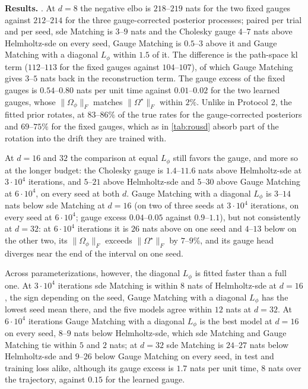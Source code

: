 \documentclass{article} %
\newcommand{\gauge}{\Omega}
\begin{document}
\textbf{Results.} . At $d = 8$ the negative \gls{elbo} is $218$--$219$ nats for the two fixed gauges against $212$--$214$ for the three gauge-corrected posterior processes; paired per trial and per seed, \gls{sde} Matching is $3$--$9$ nats and the Cholesky gauge $4$--$7$ nats above Helmholtz-\gls{sde} on every seed, Gauge Matching is $0.5$--$3$ above it and Gauge Matching with a diagonal $L_\phi$ within $1.5$ of it. The difference is the path-space \gls{kl} term ($112$--$113$ for the fixed gauges against $104$--$107$), of which Gauge Matching gives $3$--$5$ nats back in the reconstruction term. The gauge excess of the fixed gauges is $0.54$--$0.80$ nats per unit time against $0.01$--$0.02$ for the two learned gauges, whose $\|\gauge_\phi\|_F$ matches $\|\gauge^\star\|_F$ within $2\%$. Unlike in Protocol 2, the fitted prior rotates, at $83$--$86\%$ of the true rates for the gauge-corrected posteriors and $69$--$75\%$ for the fixed gauges, which as in \cref{tab:rousd} absorb part of the rotation into the drift they are trained with.

At $d = 16$ and $32$ the comparison at equal $L_\phi$ still favors the gauge, and more so at the longer budget: the Cholesky gauge is $1.4$--$11.6$ nats above Helmholtz-\gls{sde} at $3 \cdot 10^4$ iterations, and $5$--$21$ above Helmholtz-\gls{sde} and $5$--$30$ above Gauge Matching at $6 \cdot 10^4$, on every seed at both $d$. Gauge Matching with a diagonal $L_\phi$ is $3$--$14$ nats below \gls{sde} Matching at $d = 16$ (on two of three seeds at $3 \cdot 10^4$ iterations, on every seed at $6 \cdot 10^4$; gauge excess $0.04$--$0.05$ against $0.9$--$1.1$), but not consistently at $d = 32$: at $6 \cdot 10^4$ iterations it is $26$ nats above on one seed and $4$--$13$ below on the other two, its $\|\gauge_\phi\|_F$ exceeds $\|\gauge^\star\|_F$ by $7$--$9\%$, and its gauge head diverges near the end of the interval on one seed.

Across parameterizations, however, the diagonal $L_\phi$ is fitted faster than a full one. At $3 \cdot 10^4$ iterations \gls{sde} Matching is within $8$ nats of Helmholtz-\gls{sde} at $d = 16$, the sign depending on the seed, Gauge Matching with a diagonal $L_\phi$ has the lowest seed mean there, and the five models agree within $12$ nats at $d = 32$. At $6 \cdot 10^4$ iterations Gauge Matching with a diagonal $L_\phi$ is the best model at $d = 16$ on every seed, $8$--$9$ nats below Helmholtz-\gls{sde}, which \gls{sde} Matching and Gauge Matching tie within $5$ and $2$ nats; at $d = 32$ \gls{sde} Matching is $24$--$27$ nats below Helmholtz-\gls{sde} and $9$--$26$ below Gauge Matching on every seed, in test and training loss alike, although its gauge excess is $1.7$ nats per unit time, $8$ nats over the trajectory, against $0.15$ for the learned gauge.
\end{document}
